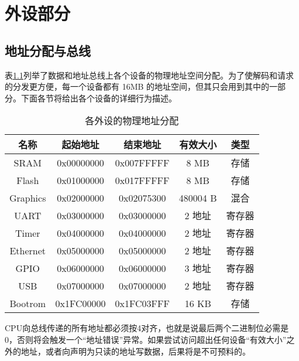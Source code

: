 \chapter{外设部分}

\section{地址分配与总线}

表\ref{table:address_allocation}列举了数据和地址总线上各个设备的物理地址空间分配。为了使解码和请求的分发更方便，每一个设备都有 16MB 的地址空间，但其只会用到其中的一部分。下面各节将给出各个设备的详细行为描述。

\begin{table}[!htbp]
    \centering
    \begin{tabular}{|c|c|c|c|c|}
    \hline
    \textbf{名称} & \textbf{起始地址} & \textbf{结束地址} & \textbf{有效大小} & \textbf{类型} \\ \hline
    SRAM        & 0x00000000    & 0x007FFFFF    & 8 MB          & 存储          \\ \hline
    Flash       & 0x01000000    & 0x017FFFFF    & 8 MB          & 存储          \\ \hline
    Graphics    & 0x02000000    & 0x02075300    & 480004 B      & 混合          \\ \hline
    UART        & 0x03000000    & 0x03000000    & 2 地址          & 寄存器         \\ \hline
    Timer       & 0x04000000    & 0x04000000    & 2 地址          & 寄存器         \\ \hline
    Ethernet    & 0x05000000    & 0x05000000    & 2 地址          & 寄存器         \\ \hline
    GPIO        & 0x06000000    & 0x06000000    & 3 地址          & 寄存器         \\ \hline
    USB         & 0x07000000    & 0x07000000    & 2 地址          & 寄存器         \\ \hline
    Bootrom     & 0x1FC00000    & 0x1FC03FFF    & 16 KB         & 存储          \\ \hline
    \end{tabular}
    \caption{各外设的物理地址分配}
    \label{table:address_allocation}
\end{table}

CPU向总线传递的所有地址都必须按4对齐，也就是说最后两个二进制位必需是0，否则将会触发一个“地址错误”异常。如果尝试访问超出任何设备“有效大小”之外的地址，或者向声明为只读的地址写数据，后果将是不可预料的。

